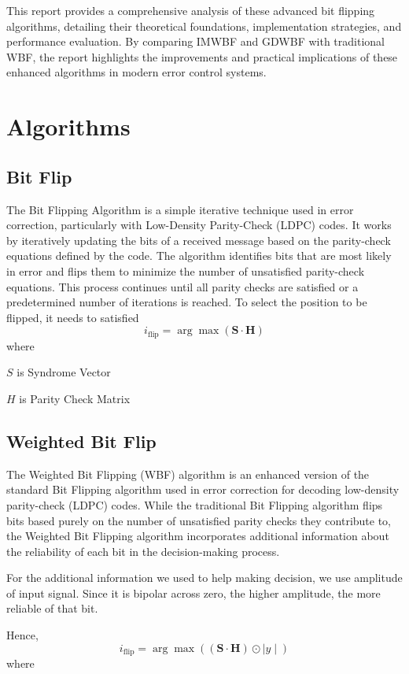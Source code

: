 \documentclass[a4paper,conference]{IEEEtran}
\begin{document}
This report provides a comprehensive analysis of these advanced bit flipping algorithms, detailing their theoretical foundations, implementation strategies, and performance evaluation. By comparing IMWBF and GDWBF with traditional WBF, the report highlights the improvements and practical implications of these enhanced algorithms in modern error control systems. 

\section{Algorithms}
\subsection{Bit Flip}
The Bit Flipping Algorithm is a simple iterative technique used in error correction, particularly with Low-Density Parity-Check (LDPC) codes. It works by iteratively updating the bits of a received message based on the parity-check equations defined by the code. The algorithm identifies bits that are most likely in error and flips them to minimize the number of unsatisfied parity-check equations. This process continues until all parity checks are satisfied or a predetermined number of iterations is reached.
To select the position to be flipped, it needs to satisfied
\[
i_{\text{flip}} = \arg\max (\mathbf{S} \cdot \mathbf{H})
\]
where 

\( S \) is Syndrome Vector

\( H \) is Parity Check Matrix
\subsection{Weighted Bit Flip}
The Weighted Bit Flipping (WBF) algorithm is an enhanced version of the standard Bit Flipping algorithm used in error correction for decoding low-density parity-check (LDPC) codes. While the traditional Bit Flipping algorithm flips bits based purely on the number of unsatisfied parity checks they contribute to, the Weighted Bit Flipping algorithm incorporates additional information about the reliability of each bit in the decision-making process.

For the additional information we used to help making decision, we use amplitude of input signal. Since it is bipolar across zero, the higher amplitude, the more reliable of that bit. 

Hence, 
\[
i_{\text{flip}} = \arg\max ( ( \mathbf{S} \cdot \mathbf{H} ) \odot \mid y\mid  )
\]
where 
\end{document}
